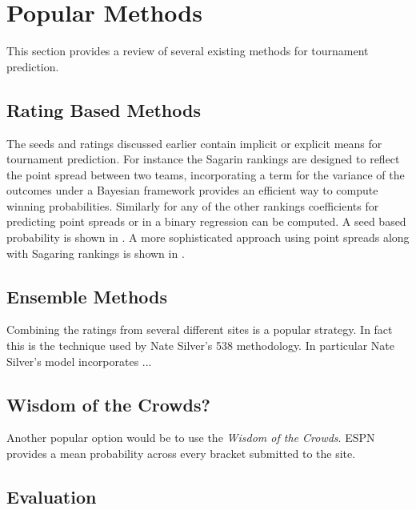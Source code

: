\section{Popular Methods}  This section provides a review of several existing methods for tournament prediction.
\subsection{Rating Based Methods} 
The seeds and ratings discussed earlier contain implicit or explicit means for tournament prediction.  For instance the Sagarin rankings are designed to reflect the point spread between two teams, incorporating a term for the variance of the outcomes under a Bayesian framework provides an efficient way to compute winning probabilities.  Similarly for any of the other rankings coefficients for predicting point spreads or in a binary regression can be computed. A seed based probability is shown in \cite{schwertman1996}.  A more sophisticated approach using point spreads along with Sagaring rankings is shown in \cite{carlin1996}.
\subsection{Ensemble Methods}
Combining the ratings from several different sites is a popular strategy.  In fact this is the technique used by Nate Silver's 538 methodology.  In particular Nate Silver's model incorporates ... 
\subsection{Wisdom of the Crowds?}
Another popular option would be to use the \emph{Wisdom of the Crowds}.  ESPN provides a mean probability across every bracket submitted to the site.

\subsection{Evaluation}

